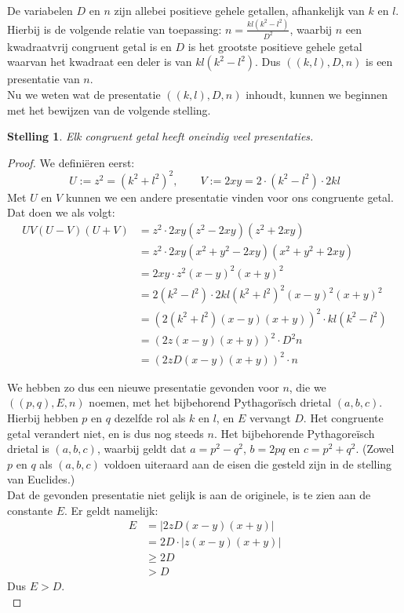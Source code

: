 \documentclass[12pt,reqno]{article}
\theoremstyle{theorem}
\newtheorem{theorem}{Stelling}
\theoremstyle{definition}
\begin{document}
	De variabelen $D$ en $n$ zijn allebei positieve gehele getallen, afhankelijk van $k$ en $l$. Hierbij is de volgende relatie van toepassing: $n=\frac{kl(k^2-l^2)}{D^2}$, waarbij $n$ een kwadraatvrij congruent getal is en $D$ is het grootste positieve gehele getal waarvan het kwadraat een deler is van $kl(k^2-l^2)$. Dus $((k,l),D,n)$ is een presentatie van $n$.\\
	
	Nu we weten wat de presentatie $((k,l),D,n)$ inhoudt, kunnen we beginnen met het bewijzen van de volgende stelling.	
	\begin{theorem}
		Elk congruent getal heeft oneindig veel presentaties.
	\end{theorem}
	
	\begin{proof}
		We defini\"eren eerst:
		\begin{equation*}
			U:=z^2=(k^2+l^2)^2, \qquad V:=2xy=2\cdot(k^2-l^2)\cdot 2kl
		\end{equation*}
		Met $U$ en $V$ kunnen we een andere presentatie vinden voor ons congruente getal. Dat doen we als volgt:
		\begin{align*}
			UV (U - V) (U + V) &= z^2 \cdot 2xy (z^2 - 2xy) (z^2 + 2xy)\\
			&= z^2 \cdot 2xy (x^2 + y^2 - 2xy) (x^2 + y^2 + 2xy)\\
			&= 2xy \cdot z^2 (x - y)^2 (x + y)^2\\
			&= 2 (k^2-l^2) \cdot 2kl (k^2+l^2)^2 (x - y)^2 (x + y)^2\\
			&= (2 (k^2+l^2) (x-y) (x+y))^2 \cdot kl (k^2-l^2)\\
			&= (2 z (x - y) (x + y))^2 \cdot D^2n\\
			&= (2 z D (x - y) (x + y))^2 \cdot n
		\end{align*}
		
		We hebben zo dus een nieuwe presentatie gevonden voor $n$, die we $((p,q),E,n)$ noemen, met het bijbehorend Pythagor\"isch drietal $(a,b,c)$. Hierbij hebben $p$ en $q$ dezelfde rol als $k$ en $l$, en $E$ vervangt $D$. Het congruente getal verandert niet, en is dus nog steeds $n$. Het bijbehorende Pythagore\"isch drietal is $(a,b,c)$, waarbij geldt dat $a=p^2-q^2$, $b=2pq$ en $c=p^2+q^2$. (Zowel $p$ en $q$ als $(a,b,c)$ voldoen uiteraard aan de eisen die gesteld zijn in de stelling van Euclides.)\\      
		
		Dat de gevonden presentatie niet gelijk is aan de originele, is te zien aan de constante $E$. Er geldt namelijk:
		\begin{equation}
			\begin{split}
				E &= | 2 z D (x-y) (x+y) | \\
				&= 2 D \cdot | z (x-y) (x+y) | \\
				&\geq 2 D \\
				&> D
			\end{split}
		\end{equation}
		Dus $E > D$.\\
		

\end{proof}
\end{document}
